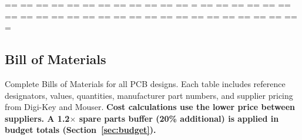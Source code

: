     == == == == == == == == == == == ==
    = %
      == == == == == == == == == == == == == == == == == == == == == == == == ==
    =

\subsection {
  Bill of Materials
}\label{app:bom}

Complete Bills of Materials for all PCB designs. Each table includes reference designators, values, quantities, manufacturer part numbers, and supplier pricing from Digi-Key and Mouser. \textbf{Cost calculations use the lower price between suppliers. A 1.2$\times$ spare parts buffer (20\% additional) is applied in budget totals (Section~\ref{sec:budget}).}

